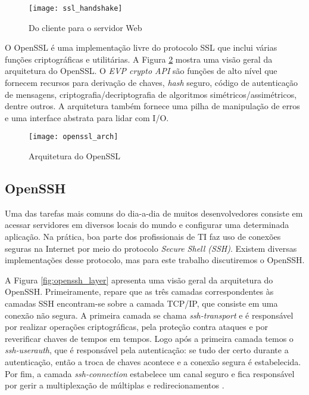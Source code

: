 \begin{figure}[!h]
  \centering
  \texttt{[image: ssl\_handshake]}
  \caption{Do cliente para o servidor Web}
  \label{fig:openssl_handshake}
\end{figure}

O OpenSSL é uma implementação livre do protocolo SSL que
inclui várias funções criptográficas e utilitárias. A Figura
\ref{fig:openssl_arch} mostra uma visão geral da arquitetura do OpenSSL. O
\emph{EVP crypto API} são funções de alto nível que fornecem recursos para
derivação de chaves, \emph{hash} seguro, código de autenticação de mensagens,
criptografia/decriptografia de algoritmos simétricos/assimétricos, dentre outros. A
arquitetura também fornece uma pilha de manipulação de erros e uma interface
abstrata para lidar com I/O.

\begin{figure}[!h]
  \centering
  \texttt{[image: openssl\_arch]}
  \caption[Arquitetura do OpenSSL]{Arquitetura do OpenSSL \citep{crypto_openssl}}
  \label{fig:openssl_arch}
\end{figure}


\subsection{OpenSSH}

Uma das tarefas mais comuns do dia-a-dia de muitos desenvolvedores consiste em
acessar servidores em diversos locais do mundo e configurar uma determinada
aplicação. Na prática, boa parte dos profissionais de TI faz uso de conexões
seguras na Internet por meio do protocolo \emph{Secure Shell (SSH)}. Existem
diversas implementações desse protocolo, mas para este trabalho discutiremos o
OpenSSH.

A Figura \ref{fig:openssh_layer} apresenta uma visão geral da arquitetura do
OpenSSH. Primeiramente, repare que as três camadas correspondentes às camadas
SSH encontram-se sobre a camada TCP/IP, que consiste em uma conexão não segura.
A primeira camada se chama \emph{ssh-transport} e é responsável por
realizar operações criptográficas, pela proteção contra ataques e por reverificar chaves
de tempos em tempos. Logo após a primeira camada temos o \emph{ssh-userauth},
que é responsável pela autenticação: se tudo der certo durante a autenticação,
então a troca de chaves acontece e a conexão segura é estabelecida. Por fim, a
camada \emph{ssh-connection} estabelece um canal seguro e fica responsável
por gerir a multiplexação de múltiplas  e redirecionamentos
\citep{proopenssh, opensshhood}.

